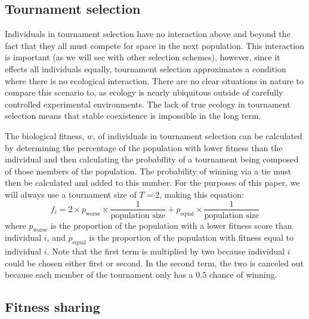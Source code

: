 \subsection{Tournament selection}
Individuals in tournament selection have no interaction above and beyond the fact that they all must compete for space in the next population. This interaction is important (as we will see with other selection schemes), however, since it effects all individuals equally, tournament selection approximates a condition where there is no ecological interaction. There are no clear situations in nature to compare this scenario to, as ecology is nearly ubiquitous outside of carefully controlled experimental environments. The lack of true ecology in tournament selection means that stable coexistence is impossible in the long term. 

The biological fitness, $w$, of individuals in tournament selection can be calculated by determining the percentage of the population with lower fitness than the individual and then calculating the probability of a tournament being composed of those members of the population. The probability of winning via a tie must then be calculated and added to this number. For the purposes of this paper, we will always use a tournament size of $T=2$, making this equation:
\begin{equation}
f_{i} = 2\times p_{\text{worse}} \times \frac{1}{\text{population size}} + p_{\text{equal}} \times \frac{1}{\text{population size}}
\label{tournament_equation}
\end{equation}
where $p_{\text{worse}}$ is the proportion of the population with a lower fitness score than individual $i$, and $p_{\text{equal}}$ is the proportion of the population with fitness equal to individual $i$. Note that the first term is multiplied by two because individual $i$ could be chosen either first or second. In the second term, the two is canceled out because each member of the tournament only has a $0.5$ chance of winning.

\subsection{Fitness sharing}

